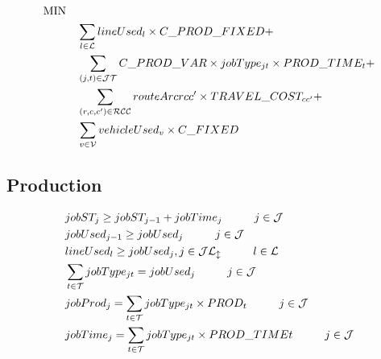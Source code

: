 \begin{align*}
\mbox{MIN} \quad &
	\label{eq:fo}\\
& \sum_{l \in \mathcal{L}} lineUsed_l \times C\_PROD\_FIXED + \notag\\
& \sum_{(j, t) \in \mathcal{JT}} C\_PROD\_VAR \times jobType_{jt} \times PROD\_TIME_t + \notag\\
& \sum_{(r, c, c') \in \mathcal{RCC}} routeArc{rcc'} \times TRAVEL\_COST_{cc'} + \notag\\
& \sum_{v \in \mathcal{V}} vehicleUsed_v \times C\_FIXED
\end{align*}



\subsection{Production}

\begin{align}
		& jobST_{j} \geq jobST_{j-1} + jobTime_{j} 
				\hspace{10mm} j \in \mathcal{J}\\
		& jobUsed_{j-1} \geq jobUsed_{j} 
				\hspace{10mm}  j \in \mathcal{J}\\
		& lineUsed_{l} \geq jobUsed_{j}, j \in \mathcal{JL_l} 
				\hspace{10mm}  l \in \mathcal{L} \\
		& \sum_{t \in \mathcal{T}} jobType_{jt} = jobUsed_{j} 
				\hspace{10mm} j \in \mathcal{J}\\
		& jobProd_{j} = \sum_{t \in \mathcal{T}} jobType_{jt} \times PROD_{t}
				\hspace{10mm} j \in \mathcal{J}\\
		& jobTime_{j} = \sum_{t \in \mathcal{T}}jobType_{jt} \times PROD\_TIME{t}
				\hspace{10mm} j \in \mathcal{J}\\
\end{align}

